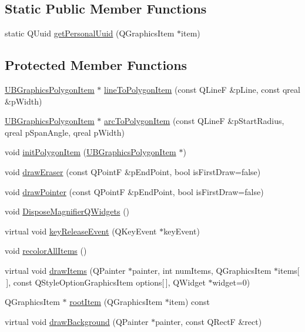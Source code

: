 \subsection*{Static Public Member Functions}
\begin{DoxyCompactItemize}
\item 
static Q\-Uuid \hyperlink{class_u_b_graphics_scene_a37bc5dc575e03198f923190aa28471a4}{get\-Personal\-Uuid} (Q\-Graphics\-Item $\ast$item)
\end{DoxyCompactItemize}
\subsection*{Protected Member Functions}
\begin{DoxyCompactItemize}
\item 
\hyperlink{class_u_b_graphics_polygon_item}{U\-B\-Graphics\-Polygon\-Item} $\ast$ \hyperlink{class_u_b_graphics_scene_acbae52cff367277a4545689a84580148}{line\-To\-Polygon\-Item} (const Q\-Line\-F \&p\-Line, const qreal \&p\-Width)
\item 
\hyperlink{class_u_b_graphics_polygon_item}{U\-B\-Graphics\-Polygon\-Item} $\ast$ \hyperlink{class_u_b_graphics_scene_adec9587c37629dfc0c0f97ad7e55b1d5}{arc\-To\-Polygon\-Item} (const Q\-Line\-F \&p\-Start\-Radius, qreal p\-Span\-Angle, qreal p\-Width)
\item 
void \hyperlink{class_u_b_graphics_scene_aaf699f898652e303dce0a2e32912cc38}{init\-Polygon\-Item} (\hyperlink{class_u_b_graphics_polygon_item}{U\-B\-Graphics\-Polygon\-Item} $\ast$)
\item 
void \hyperlink{class_u_b_graphics_scene_a33bbd5491a97af58af92258277b082a6}{draw\-Eraser} (const Q\-Point\-F \&p\-End\-Point, bool is\-First\-Draw=false)
\item 
void \hyperlink{class_u_b_graphics_scene_ac27d72055526bee27be5423783199e72}{draw\-Pointer} (const Q\-Point\-F \&p\-End\-Point, bool is\-First\-Draw=false)
\item 
void \hyperlink{class_u_b_graphics_scene_ab0deb0a23ddf5b7fd731d462e09f6a93}{Dispose\-Magnifier\-Q\-Widgets} ()
\item 
virtual void \hyperlink{class_u_b_graphics_scene_a07dbd2ed42e2a4ed6519f958f4ef5138}{key\-Release\-Event} (Q\-Key\-Event $\ast$key\-Event)
\item 
void \hyperlink{class_u_b_graphics_scene_abf9af798da94f99bf882f12efece0c4c}{recolor\-All\-Items} ()
\item 
virtual void \hyperlink{class_u_b_graphics_scene_aae6c0821542f935f82dcd3db7b667243}{draw\-Items} (Q\-Painter $\ast$painter, int num\-Items, Q\-Graphics\-Item $\ast$items\mbox{[}$\,$\mbox{]}, const Q\-Style\-Option\-Graphics\-Item options\mbox{[}$\,$\mbox{]}, Q\-Widget $\ast$widget=0)
\item 
Q\-Graphics\-Item $\ast$ \hyperlink{class_u_b_graphics_scene_ab97281916a62e6721053cf31fab06e5f}{root\-Item} (Q\-Graphics\-Item $\ast$item) const 
\item 
virtual void \hyperlink{class_u_b_graphics_scene_a3fc3dc565b7e1f6a8e9afcd29bc9f2d5}{draw\-Background} (Q\-Painter $\ast$painter, const Q\-Rect\-F \&rect)
\end{DoxyCompactItemize}
